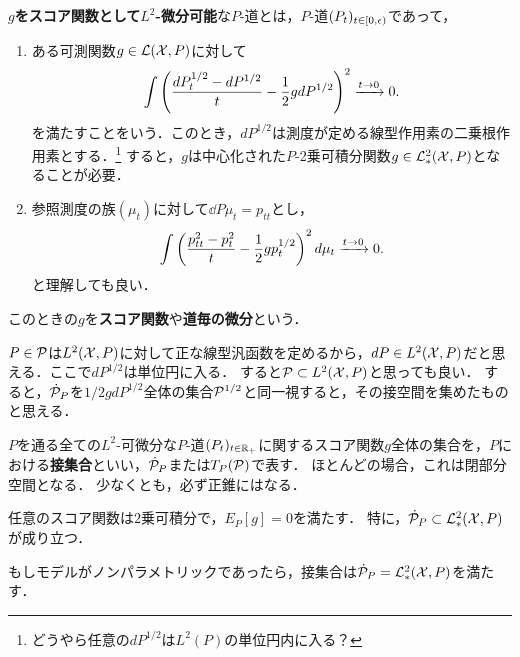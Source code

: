 \documentclass[uplatex,dvipdfmx]{jsreport}
\begin{document}
\begin{definition}
    \textbf{$g$をスコア関数として$L^2$-微分可能}な$P$-道とは，$P$-道$(P_t)_{t\in[0,\ep)}$であって，
    \begin{enumerate}
        \item ある可測関数$g\in\L(\X,P)$に対して
        \[\int\paren{\frac{dP^{1/2}_t-dP^{1/2}}{t}-\frac{1}{2}gdP^{1/2}}^2\xrightarrow{t\to0}0.\]
        を満たすことをいう．このとき，$dP^{1/2}$は測度が定める線型作用素の二乗根作用素とする．\footnote{どうやら任意の$dP^{1/2}$は$L^2(P)$の単位円内に入る？}
        すると，$g$は中心化された$P$-2乗可積分関数$g\in\L^2_*(\X,P)$となることが必要．\cite{vanderVaart Semiparametric Theory}
        \item 参照測度の族$(\mu_t)$に対して$\dd{P}{\mu_t}=p_{tt}$とし，
        \[\int\paren{\frac{p_{tt}^2-p_t^2}{t}-\frac{1}{2}gp_t^{1/2}}^2d\mu_t\xrightarrow{t\to0}0.\]
        と理解しても良い．
    \end{enumerate}
    このときの$g$を\textbf{スコア関数}や\textbf{道毎の微分}という．
\end{definition}
\begin{remarks}[セミパラメトリックモデルの幾何学的描像]
    $P\in\P$は$L^2(\X,P)$に対して正な線型汎函数を定めるから，$dP\in L^2(\X,P)$だと思える．ここで$dP^{1/2}$は単位円に入る．
    すると$\P\subset L^2(\X,P)$と思っても良い．
    すると，$\dot{\P}_P$を$1/2gdP^{1/2}$全体の集合$\P^{1/2}$と同一視すると，その接空間を集めたものと思える．
\end{remarks}

\begin{definition}
    $P$を通る全ての$L^2$-可微分な$P$-道$(P_t)_{t\in\R_+}$に関するスコア関数$g$全体の集合を，$P$における\textbf{接集合}といい，$\dot{\P}_P$\cite{vanderVaart Semiparametric Theory}または$T_P(\P)$\cite{Pfanzagl}で表す．
    ほとんどの場合，これは閉部分空間となる．
    少なくとも，必ず正錐にはなる．
\end{definition}

\begin{lemma}
    任意のスコア関数は$2$乗可積分で，$E_P[g]=0$を満たす\cite{vanderVaart Semiparametric Theory}．
    特に，$\dot{\P}_P\subset\L^2_*(\X,P)$が成り立つ．
\end{lemma}
\begin{remarks}
    もしモデルがノンパラメトリックであったら，接集合は$\dot{\P}_P=\L^2_*(\X,P)$を満たす．
\end{remarks}
\end{document}

